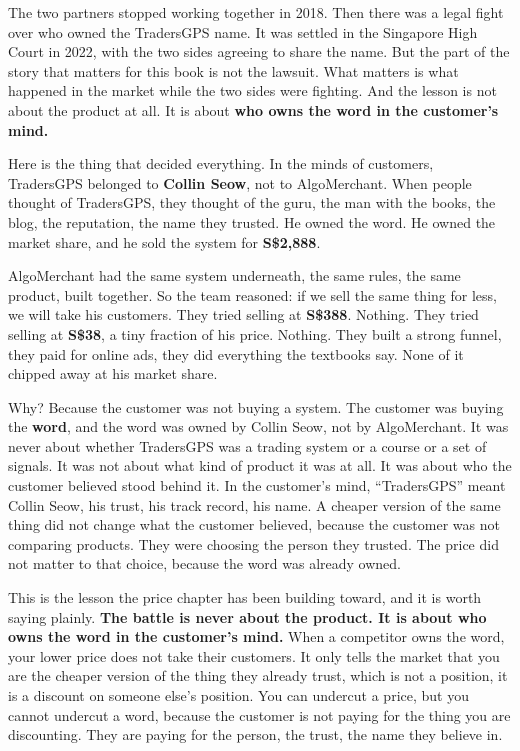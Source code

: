 \documentclass[10pt,twoside,openany]{memoir}
\begin{document}
{The two partners stopped working together in 2018. Then there was a
legal fight over who owned the TradersGPS name. It was settled in the
Singapore High Court in 2022, with the two sides agreeing to share the
name. But the part of the story that matters for this book is not the
lawsuit. What matters is what happened in the market while the two sides
were fighting. And the lesson is not about the product at all. It is
about \textbf{who owns the word in the customer's mind.}

Here is the thing that decided everything. In the minds of customers,
TradersGPS belonged to \textbf{Collin Seow}, not to AlgoMerchant. When
people thought of TradersGPS, they thought of the guru, the man with the
books, the blog, the reputation, the name they trusted. He owned the
word. He owned the market share, and he sold the system for
\textbf{S\$2,888}.

AlgoMerchant had the same system underneath, the same rules, the same
product, built together. So the team reasoned: if we sell the same thing
for less, we will take his customers. They tried selling at
\textbf{S\$388}. Nothing. They tried selling at \textbf{S\$38}, a tiny
fraction of his price. Nothing. They built a strong funnel, they paid
for online ads, they did everything the textbooks say. None of it
chipped away at his market share.

Why? Because the customer was not buying a system. The customer was
buying the \textbf{word}, and the word was owned by Collin Seow, not by
AlgoMerchant. It was never about whether TradersGPS was a trading system
or a course or a set of signals. It was not about what kind of product
it was at all. It was about who the customer believed stood behind it.
In the customer's mind, ``TradersGPS'' meant Collin Seow, his trust, his
track record, his name. A cheaper version of the same thing did not
change what the customer believed, because the customer was not
comparing products. They were choosing the person they trusted. The
price did not matter to that choice, because the word was already owned.

This is the lesson the price chapter has been building toward, and it is
worth saying plainly. \textbf{The battle is never about the product. It
is about who owns the word in the customer's mind.} When a competitor
owns the word, your lower price does not take their customers. It only
tells the market that you are the cheaper version of the thing they
already trust, which is not a position, it is a discount on someone
else's position. You can undercut a price, but you cannot undercut a
word, because the customer is not paying for the thing you are
discounting. They are paying for the person, the trust, the name they
believe in.

}
\end{document}
